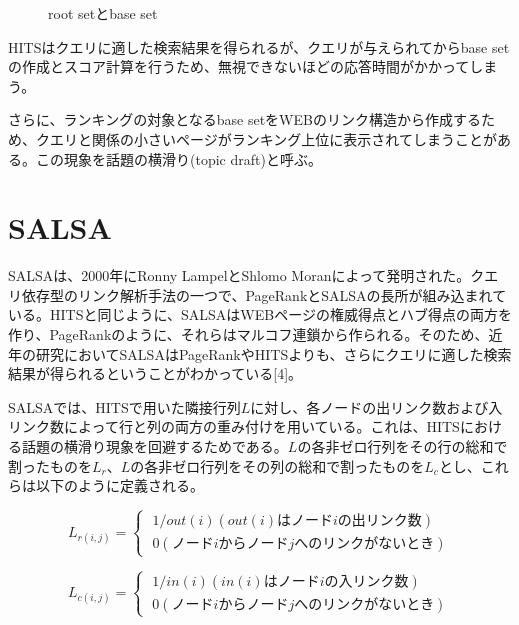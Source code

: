 \documentclass[a4paper,11pt]{jreport}
\begin{document}
\begin{figure}[htbp]
\begin{center}
\end{center}
\caption{root setとbase set}
\label{figure:sample}
\end{figure}

HITSはクエリに適した検索結果を得られるが、クエリが与えられてからbase setの作成とスコア計算を行うため、無視できないほどの応答時間がかかってしまう。

さらに、ランキングの対象となるbase setをWEBのリンク構造から作成するため、クエリと関係の小さいページがランキング上位に表示されてしまうことがある。この現象を話題の横滑り(topic draft)と呼ぶ。

\section{SALSA}

SALSAは、2000年にRonny LampelとShlomo Moranによって発明された。クエリ依存型のリンク解析手法の一つで、PageRankとSALSAの長所が組み込まれている。HITSと同じように、SALSAはWEBページの権威得点とハブ得点の両方を作り、PageRankのように、それらはマルコフ連鎖から作られる。そのため、近年の研究においてSALSAはPageRankやHITSよりも、さらにクエリに適した検索結果が得られるということがわかっている[4]。

SALSAでは、HITSで用いた隣接行列$L$に対し、各ノードの出リンク数および入リンク数によって行と列の両方の重み付けを用いている。これは、HITSにおける話題の横滑り現象を回避するためである。$L$の各非ゼロ行列をその行の総和で割ったものを$L_r$、$L$の各非ゼロ行列をその列の総和で割ったものを$L_c$とし、これらは以下のように定義される。

\begin{equation}
L_{r(i,j)} =
\begin{cases}
\; 1/out(i)　(out(i)はノードiの出リンク数) \\
\; 0　(ノードiからノードjへのリンクがないとき)
\end{cases}
\end{equation}

\begin{equation}
L_{c(i,j)} =
\begin{cases}
\; 1/in(i)　(in(i)はノードiの入リンク数) \\
\; 0　(ノードiからノードjへのリンクがないとき)
\end{cases}
\end{equation}
\end{document}

